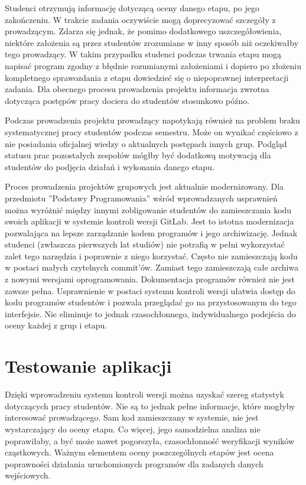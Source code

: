 Studenci otrzymują informację dotyczącą oceny danego etapu, po jego zakończeniu.
W trakcie zadania oczywiście mogą doprecyzować szczegóły z prowadzącym.
Zdarza się jednak, że pomimo dodatkowego uszczegółowienia, niektóre założenia są przez studentów zrozumiane w inny sposób niż oczekiwałby tego prowadzący.
W takim przypadku studenci podczas trwania etapu mogą napisać program zgodny z błędnie rozumianymi założeniami i dopiero po złożeniu kompletnego sprawozdania z etapu dowiedzieć się o niepoprawnej interpretacji zadania.
Dla obecnego procesu prowadzenia projektu informacja zwrotna dotycząca postępów pracy dociera do studentów stosunkowo późno.

Podczas prowadzenia projektu prowadzący napotykają również na problem braku systematycznej pracy studentów podczas semestru.
Może on wynikać częściowo z nie posiadania oficjalnej wiedzy o aktualnych postępach innych grup.
Podgląd statusu prac pozostałych zespołów mógłby być dodatkową motywacją dla studentów do podjęcia działań i wykonania danego etapu.

Proces prowadzenia projektów grupowych jest aktualnie modernizowany.
Dla przedmiotu ”Podstawy Programowania” wśród wprowadzanych usprawnień można wyróżnić między innymi zobligowanie studentów do zamieszczania kodu swoich aplikacji w systemie kontroli wersji GitLab.
Jest to istotna modernizacja pozwalająca na lepsze zarządzanie kodem programów i jego archiwizację.
Jednak studenci (zwłaszcza pierwszych lat studiów) nie potrafią w pełni wykorzystać zalet tego narzędzia i poprawnie z niego korzystać.
Często nie zamieszczają kodu w postaci małych czytelnych commit'ów.
Zamiast tego zamieszczają całe archiwa z nowymi wersjami oprogramowania.
Dokumentacja programów również nie jest zawsze pełna.
Usprawnienie w postaci systemu kontroli wersji ułatwia dostęp do kodu programów studentów i pozwala przeglądać go na przystosowanym do tego interfejsie.
Nie eliminuje to jednak czasochłonnego, indywidualnego podejścia do oceny każdej z grup i etapu.


\section{Testowanie aplikacji}
\label{programs-testing}

Dzięki wprowadzeniu systemu kontroli wersji można uzyskać szereg statystyk dotyczących pracy studentów.
Nie są to jednak pełne informacje, które mogłyby interesować prowadzącego.
Sam kod zamieszczany w systemie, nie jest wystarczający do oceny etapu.
Co więcej, jego samodzielna analiza nie poprawiłaby, a być może nawet pogorszyła, czasochłonność weryfikacji wyników cząstkowych.
Ważnym elementem oceny poszczególnych etapów jest ocena poprawności działania uruchomionych programów dla zadanych danych wejściowych.

